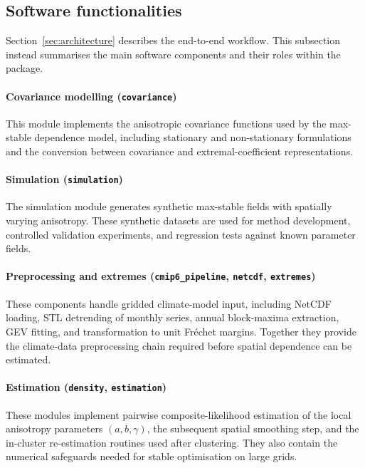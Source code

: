 \documentclass[preprint,12pt,a4paper]{elsarticle}
\begin{document}
\subsection{Software functionalities}
\label{sec:functionalities}

Section~\ref{sec:architecture} describes the end-to-end workflow.
This subsection instead summarises the main software components and
their roles within the package.

\paragraph{Covariance modelling (\texttt{covariance})}
This module implements the anisotropic covariance functions used by
the max-stable dependence model, including stationary and
non-stationary formulations and the conversion between covariance and
extremal-coefficient representations.

\paragraph{Simulation (\texttt{simulation})}
The simulation module generates synthetic max-stable fields with
spatially varying anisotropy. These synthetic datasets are used for
method development, controlled validation experiments, and regression
tests against known parameter fields.

\paragraph{Preprocessing and extremes (\texttt{cmip6\_pipeline}, \texttt{netcdf}, \texttt{extremes})}
These components handle gridded climate-model input, including NetCDF
loading, STL detrending of monthly series, annual block-maxima
extraction, GEV fitting, and transformation to unit Fr\'{e}chet
margins. Together they provide the climate-data preprocessing chain
required before spatial dependence can be estimated.

\paragraph{Estimation (\texttt{density}, \texttt{estimation})}
These modules implement pairwise composite-likelihood estimation of
the local anisotropy parameters $(a,b,\gamma)$, the subsequent spatial
smoothing step, and the in-cluster re-estimation routines used after
clustering. They also contain the numerical safeguards needed for
stable optimisation on large grids.
\end{document}

